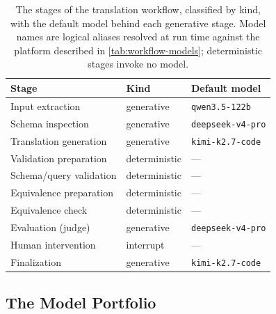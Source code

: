 \begin{table}[H]
\centering
\caption[The nodes of the translation workflow]{The stages of the translation workflow, classified by kind, with the default model behind each generative stage. Model names are logical aliases resolved at run time against the platform described in \cref{tab:workflow-models}; deterministic stages invoke no model.}
\label{tab:workflow-nodes}
\small
\begin{tabular}{@{}l l l@{}}
\toprule
\textbf{Stage} & \textbf{Kind} & \textbf{Default model} \\
\midrule
Input extraction        & generative & \texttt{qwen3.5-122b} \\
Schema inspection       & generative & \texttt{deepseek-v4-pro} \\
Translation generation  & generative & \texttt{kimi-k2.7-code} \\
Validation preparation  & deterministic & --- \\
Schema/query validation & deterministic & --- \\
Equivalence preparation & deterministic & --- \\
Equivalence check       & deterministic & --- \\
Evaluation (judge)      & generative & \texttt{deepseek-v4-pro} \\
Human intervention      & interrupt  & --- \\
Finalization            & generative & \texttt{kimi-k2.7-code} \\
\bottomrule
\end{tabular}
\end{table}

\subsection{The Model Portfolio}
\label{sec:workflow-models}

